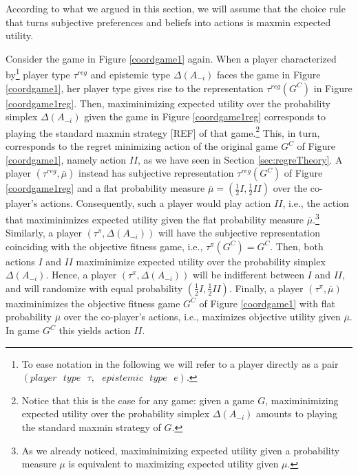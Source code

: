 \documentclass[fleqn,reqno,11pt]{article}
\begin{document}
According to what we argued in this section, we will assume that the choice rule that turns subjective preferences and beliefs into actions is maxmin expected utility.



\begin{example}
  Consider the game in Figure \ref{coordgame1} again. When a player characterized
  by\footnote{To ease notation in the following we will refer to a player directly as a pair
    $(player \text{ } type \text{ } \tau,\text{ } epistemic\text{ } type \text{ } e)$.} player
  type $ \tau^{reg} $ and epistemic type $ \Delta(A_{-i}) $ faces the game in Figure
  \ref{coordgame1}, her player type gives rise to the representation $\tau^{reg}(G^C)$ in
  Figure \ref{coordgame1reg}. Then, maximinimizing expected utility over the probability
  simplex $ \Delta(A_{-i}) $ given the game in Figure \ref{coordgame1reg} corresponds to
  playing the standard maxmin strategy [REF] of that game.\footnote{Notice that this is the
    case for any game: given a game $G$, maximinimizing expected utility over the probability
    simplex $ \Delta(A_{-i}) $ amounts to playing the standard maxmin strategy of $G$.} This,
  in turn, corresponds to the regret minimizing action of the original game $G^C$ of Figure
  \ref{coordgame1}, namely action $II$, as we have seen in Section \ref{sec:regreTheory}. A
  player $(\tau^{reg},\overline{\mu})$ instead has subjective representation $\tau^{reg}(G^C)$
  of Figure \ref{coordgame1reg} and a flat probability measure
  $\overline{\mu}=(\frac{1}{2}I,\frac{1}{2}II)$ over the co-player's actions. Consequently,
  such a player would play action $II$, i.e., the action that maximinimizes expected utility
  given the flat probability measure $\overline{\mu}$.\footnote{As we already noticed,
    maximinimizing expected utility given a probability measure $\mu$ is equivalent to
    maximizing expected utility given $\mu$.}  Similarly, a player
  $(\tau^{\pi},\Delta(A_{-i}))$ will have the subjective representation coinciding with the
  objective fitness game, i.e., $ \tau^{\pi}(G^C)= G^C $. Then, both actions $I$ and $II$
  maximinimize expected utility over the probability simplex $ \Delta(A_{-i}) $. Hence, a
  player $(\tau^{\pi},\Delta(A_{-i}))$ will be indifferent between $I$ and $II$, and will
  randomize with equal probability $(\frac{1}{2}I,\frac{1}{2}II)$. Finally, a player
  $(\tau^{\pi},\overline{\mu})$ maximinimizes the objective fitness game $G^C$ of Figure
  \ref{coordgame1} with flat probability $\overline{\mu}$ over the co-player's actions, i.e.,
  maximizes objective utility given $\overline{\mu}$. In game $G^C$ this yields action $II$.

\end{example}
\end{document}

